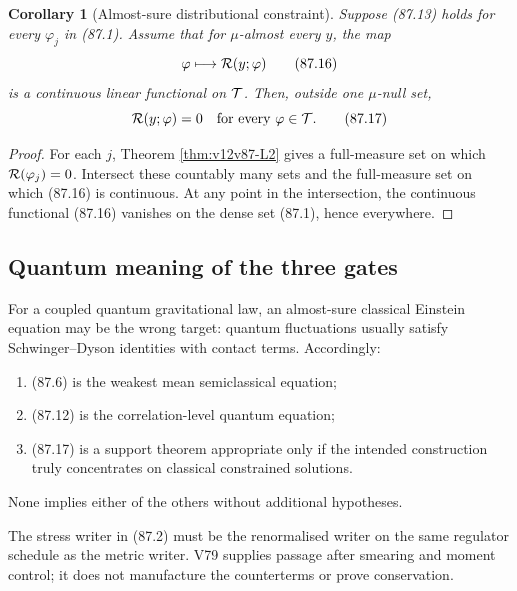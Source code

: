 \documentclass[11pt]{article}
\newtheorem{corollary}[theorem]{Corollary}
\theoremstyle{remark}
\begin{document}
\begin{corollary}[Almost-sure distributional constraint]
\label{cor:v12v87-distribution}
Suppose (87.13) holds for every \(\varphi_j\) in (87.1).
Assume that for \(\mu\)-almost every \(y\), the map
\begin{equation}
                         \varphi\longmapsto
                         {\cal R}(y;\varphi)                 \tag{87.16}
\end{equation}
is a continuous linear functional on \({\cal T}\).  Then, outside
one \(\mu\)-null set,
\begin{equation}
                         {\cal R}(y;\varphi)=0
                         \quad\text{for every }\varphi\in{\cal T}.
                                                                    \tag{87.17}
\end{equation}
\end{corollary}

\begin{proof}
For each \(j\), Theorem \ref{thm:v12v87-L2} gives a full-measure set
on which \({\cal R}(\varphi_j)=0\).  Intersect these countably many
sets and the full-measure set on which (87.16) is continuous.
At any point in the intersection, the continuous functional
(87.16) vanishes on the dense set (87.1), hence everywhere.
\end{proof}

\subsection{Quantum meaning of the three gates}

For a coupled quantum gravitational law, an almost-sure classical
Einstein equation may be the wrong target: quantum fluctuations
usually satisfy Schwinger--Dyson identities with contact terms.
Accordingly:
\begin{enumerate}
\item (87.6) is the weakest mean semiclassical equation;
\item (87.12) is the correlation-level quantum equation;
\item (87.17) is a support theorem appropriate only if the intended
      construction truly concentrates on classical constrained
      solutions.
\end{enumerate}
None implies either of the others without additional hypotheses.

The stress writer in (87.2) must be the renormalised writer on the
same regulator schedule as the metric writer.  V79 supplies passage
after smearing and moment control; it does not manufacture the
counterterms or prove conservation.
\end{document}
